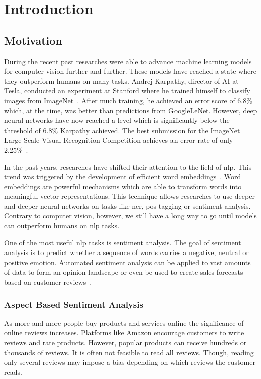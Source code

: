\chapter{Introduction}
\label{chap:introduction}

\section{Motivation}
\label{sec:introduction_motivation}

During the recent past researches were able to advance machine learning models for computer vision further and further. These models have reached a state where they outperform humans on many tasks. Andrej Karpathy, director of AI at Tesla, conducted an experiment at Stanford where he trained himself to classify images from ImageNet~\cite{Karpathy2014}. After much training, he achieved an error score of 6.8\% which, at the time, was better than predictions from GoogleLeNet. However, deep neural networks have now reached a level which is significantly below the threshold of 6.8\% Karpathy achieved. The best submission for the ImageNet Large Scale Visual Recognition Competition achieves an error rate of only 2.25\%~\cite{Hu2018}.
\bigskip

In the past years, researches have shifted their attention to the field of \acrfull{nlp}. This trend was triggered by the development of efficient word embeddings~\cite{Mikolov2013c}. Word embeddings are powerful mechanisms which are able to transform words into meaningful vector representations. This technique allows researches to use deeper and deeper neural networks on tasks like \gls{ner}, \gls{pos} tagging or sentiment analysis. Contrary to computer vision, however, we still have a long way to go until models can outperform humans on \gls{nlp} tasks.
\bigskip

One of the most useful \gls{nlp} tasks is sentiment analysis. The goal of sentiment analysis is to predict whether a sequence of words carries a negative, neutral or positive emotion. Automated sentiment analysis can be applied to vast amounts of data to form an opinion landscape or even be used to create sales forecasts based on customer reviews~\cite{Shen2015}. 
\medskip

\subsection*{Aspect Based Sentiment Analysis}

As more and more people buy products and services online the significance of online reviews increases. Platforms like Amazon encourage customers to write reviews and rate products. However, popular products can receive hundreds or thousands of reviews. It is often not feasible to read all reviews. Though, reading only several reviews may impose a bias depending on which reviews the customer reads.
\medskip

